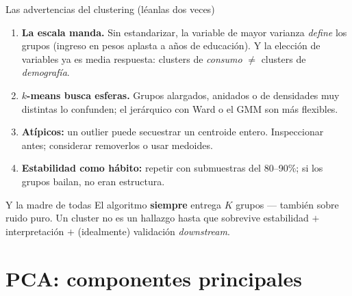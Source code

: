 \documentclass{beamer}
\newcommand{\1}{\mathbb{I}}
\begin{document}
\begin{frame}{Las advertencias del clustering (léanlas dos veces)}
\small
\begin{enumerate}\itemsep6pt
  \item \textbf{La escala manda.} Sin estandarizar, la variable de mayor varianza \emph{define} los grupos (ingreso en pesos aplasta a años de educación). Y la elección de variables ya es media respuesta: clusters de \emph{consumo} $\neq$ clusters de \emph{demografía}. \pause
  \item \textbf{$k$-means busca esferas.} Grupos alargados, anidados o de densidades muy distintas lo confunden; el jerárquico con Ward o el GMM son más flexibles. \pause
  \item \textbf{Atípicos:} un outlier puede secuestrar un centroide entero. Inspeccionar antes; considerar removerlos o usar medoides. \pause
  \item \textbf{Estabilidad como hábito:} repetir con submuestras del 80--90\%; si los grupos bailan, no eran estructura. \pause
\end{enumerate}

\vspace{0.1cm}
\begin{block}{Y la madre de todas}
El algoritmo \textbf{siempre} entrega $K$ grupos --- también sobre ruido puro. Un cluster no es un hallazgo hasta que sobrevive estabilidad $+$ interpretación $+$ (idealmente) validación \emph{downstream}.
\end{block}
\end{frame}


\section{PCA: componentes principales}
\begin{frame}[noframenumbering]
\tableofcontents[currentsection]
\end{frame}
\end{document}
